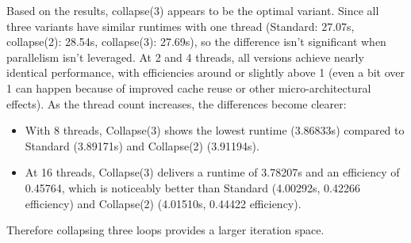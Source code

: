 \documentclass[11pt]{article}
\begin{document}
Based on the results, collapse(3) appears to be the optimal variant. Since all three variants have similar runtimes with one thread (Standard: 27.07s, collapse(2): 28.54s, collapse(3): 27.69s), so the difference isn’t significant when parallelism isn’t leveraged. At 2 and 4 threads, all versions achieve nearly identical performance, with efficiencies around or slightly above 1 (even a bit over 1 can happen because of improved cache reuse or other micro-architectural effects). As the thread count increases, the differences become clearer:
\begin{itemize}
    \item With 8 threads, Collapse(3) shows the lowest runtime (3.86833s) compared to Standard (3.89171s) and Collapse(2) (3.91194s).
    \item At 16 threads, Collapse(3) delivers a runtime of 3.78207s and an efficiency of 0.45764, which is noticeably better than Standard (4.00292s, 0.42266 efficiency) and Collapse(2) (4.01510s, 0.44422 efficiency).
\end{itemize}

Therefore collapsing three loops provides a larger iteration space.

\newpage
\end{document}
